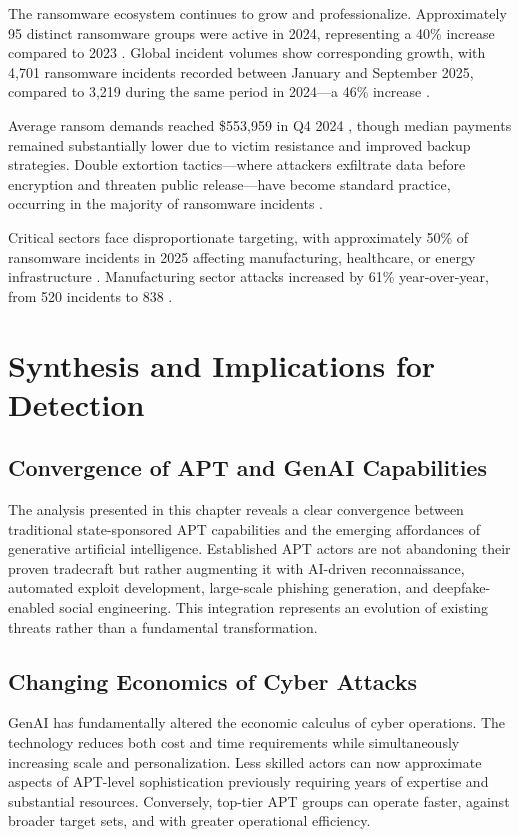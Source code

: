 The ransomware ecosystem continues to grow and professionalize. Approximately 95 distinct ransomware groups were active in 2024, representing a 40\% increase compared to 2023 \cite{brightdefense2025}. Global incident volumes show corresponding growth, with 4,701 ransomware incidents recorded between January and September 2025, compared to 3,219 during the same period in 2024—a 46\% increase \cite{industrialcyber2025}.

Average ransom demands reached \$553,959 in Q4 2024 \cite{brightdefense2025}, though median payments remained substantially lower due to victim resistance and improved backup strategies. Double extortion tactics—where attackers exfiltrate data before encryption and threaten public release—have become standard practice, occurring in the majority of ransomware incidents \cite{veeam2025}.

Critical sectors face disproportionate targeting, with approximately 50\% of ransomware incidents in 2025 affecting manufacturing, healthcare, or energy infrastructure \cite{industrialcyber2025}. Manufacturing sector attacks increased by 61\% year-over-year, from 520 incidents to 838 \cite{industrialcyber2025}.

\section{Synthesis and Implications for Detection}

\subsection{Convergence of APT and GenAI Capabilities}

The analysis presented in this chapter reveals a clear convergence between traditional state-sponsored APT capabilities and the emerging affordances of generative artificial intelligence. Established APT actors are not abandoning their proven tradecraft but rather augmenting it with AI-driven reconnaissance, automated exploit development, large-scale phishing generation, and deepfake-enabled social engineering. This integration represents an evolution of existing threats rather than a fundamental transformation.

\subsection{Changing Economics of Cyber Attacks}

GenAI has fundamentally altered the economic calculus of cyber operations. The technology reduces both cost and time requirements while simultaneously increasing scale and personalization. Less skilled actors can now approximate aspects of APT-level sophistication previously requiring years of expertise and substantial resources. Conversely, top-tier APT groups can operate faster, against broader target sets, and with greater operational efficiency.

